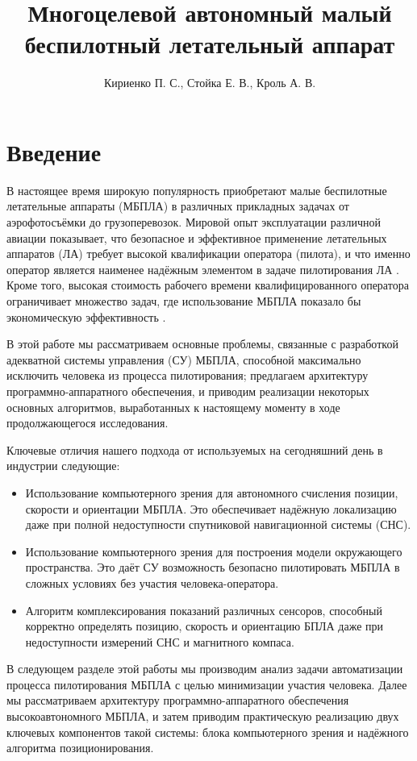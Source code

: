 \documentclass[11pt,a4paper]{article}
\title{Многоцелевой автономный малый беспилотный летательный аппарат}
\author{Кириенко П. С., Стойка Е. В., Кроль А. В.}
\affil{Zubax Robotics, г. Москва}
\date{}
\begin{document}
\maketitle

\section{Введение}

В настоящее время широкую популярность приобретают малые беспилотные летательные аппараты (МБПЛА) в различных прикладных задачах от аэрофотосъёмки до грузоперевозок. Мировой опыт эксплуатации различной авиации показывает, что безопасное и эффективное применение летательных аппаратов (ЛА) требует высокой квалификации оператора (пилота), и что именно оператор является наименее надёжным элементом в задаче пилотирования ЛА \cite{RiskManagementHandbookFAA, PlaneCrashInfo, HumanFactorsBoeing}. Кроме того, высокая стоимость рабочего времени квалифицированного оператора ограничивает множество задач, где использование МБПЛА показало бы экономическую эффективность \cite{DroneHire}.

В этой работе мы рассматриваем основные проблемы, связанные с разработкой адекватной системы управления (СУ) МБПЛА, способной максимально исключить человека из процесса пилотирования; предлагаем архитектуру программно-аппаратного обеспечения, и приводим реализации некоторых основных алгоритмов, выработанных к настоящему моменту в ходе продолжающегося исследования.

Ключевые отличия нашего подхода от используемых на сегодняшний день в индустрии следующие:

\begin{itemize}
    \item Использование компьютерного зрения для автономного счисления позиции, скорости и ориентации МБПЛА. Это обеспечивает надёжную локализацию даже при полной недоступности спутниковой навигационной системы (СНС).
    \item Использование компьютерного зрения для построения модели окружающего пространства. Это даёт СУ возможность безопасно пилотировать МБПЛА в сложных условиях без участия человека-оператора.
    \item Алгоритм комплексирования показаний различных сенсоров, способный корректно определять позицию, скорость и ориентацию БПЛА даже при недоступности измерений СНС и магнитного компаса.
\end{itemize}

В следующем разделе этой работы мы производим анализ задачи автоматизации процесса пилотирования МБПЛА с целью минимизации участия человека. Далее мы рассматриваем архитектуру программно-аппаратного обеспечения высокоавтономного МБПЛА, и затем приводим практическую реализацию двух ключевых компонентов такой системы: блока компьютерного зрения и надёжного алгоритма позиционирования.
\end{document}
